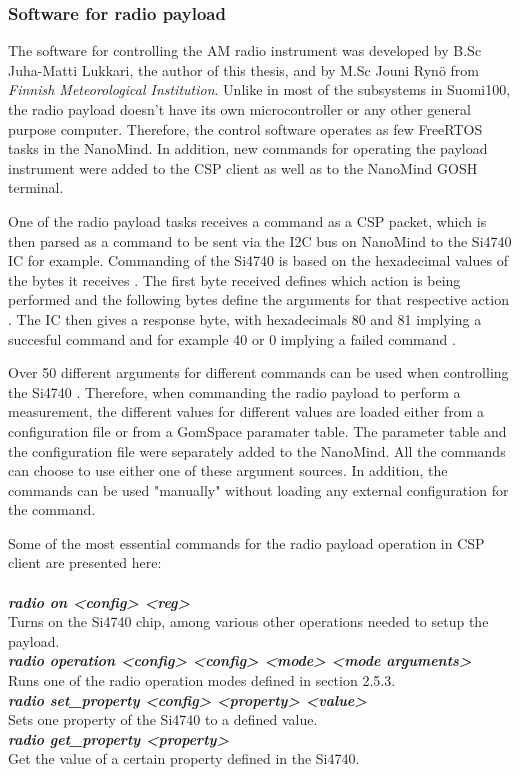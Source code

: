 \documentclass[english,12pt,a4paper,pdftex,elec,utf8]{aaltothesis}
\begin{document}
\subsubsection{Software for radio payload}
The software for controlling the AM radio instrument was developed by B.Sc Juha-Matti Lukkari, the author of this thesis, and by M.Sc Jouni Rynö from \textit{Finnish Meteorological Institution}. Unlike in most of the subsystems in Suomi100, the radio payload doesn't have its own microcontroller or any other general purpose computer. Therefore, the control software operates as few FreeRTOS tasks in the NanoMind. In addition, new commands for operating the payload instrument were added to the CSP client as well as to the NanoMind GOSH terminal.  \par
One of the radio payload tasks receives a command as a CSP packet, which is then parsed as a command to be sent via the I2C bus on NanoMind to the Si4740 IC for example. Commanding of the Si4740 is based on the hexadecimal values of the bytes it receives \cite{sids}. The first byte received defines which action is being performed and the following bytes define the arguments for that respective action \cite{sids}. The IC then gives a response byte, with hexadecimals 80 and 81 implying a succesful command and for example 40 or 0 implying a failed command \cite{sids}. \par
Over 50 different arguments for different commands can be used when controlling the Si4740 \cite{sids}. Therefore, when commanding the radio payload to perform a measurement, the different values for different values are loaded either from a configuration file or from a GomSpace paramater table. The parameter table and the configuration file were separately added to the NanoMind. All the commands can choose to use either one of these argument sources. In addition, the commands can be used "manually" without loading any external configuration for the command. \par
Some of the most essential commands for the radio payload operation in CSP client are presented here:
\\
\\
\textit{\textbf{radio on <config> <reg>}}\\
Turns on the Si4740 chip, among various other operations needed to setup the payload.\\
\textit{\textbf{radio operation <config> <config> <mode> <mode arguments>}}\\
Runs one of the radio operation modes defined in section 2.5.3.\\ 
\textit{\textbf{radio set\_property <config> <property> <value>}}\\
Sets one property of the Si4740 to a defined value.\\
\textit{\textbf{radio get\_property <property>}}\\
Get the value of a certain property defined in the Si4740.\\
\end{document}
